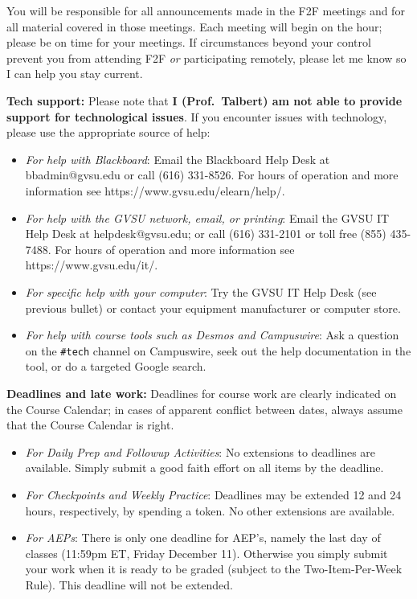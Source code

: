 \documentclass[]{article}
\providecommand{\tightlist}{%
  \setlength{\itemsep}{0pt}\setlength{\parskip}{0pt}}
\begin{document}
You will be responsible for all announcements made in the F2F meetings
and for all material covered in those meetings. Each meeting will begin
on the hour; please be on time for your meetings. If circumstances
beyond your control prevent you from attending F2F \emph{or}
participating remotely, please let me know so I can help you stay
current.

\textbf{Tech support:} Please note that \textbf{I (Prof.~Talbert) am not
able to provide support for technological issues}. If you encounter
issues with technology, please use the appropriate source of help:

\begin{itemize}
\tightlist
\item
  \emph{For help with Blackboard}: Email the Blackboard Help Desk at
  bbadmin@gvsu.edu or call (616) 331-8526. For hours of operation and
  more information see https://www.gvsu.edu/elearn/help/.
\item
  \emph{For help with the GVSU network, email, or printing}: Email the
  GVSU IT Help Desk at helpdesk@gvsu.edu; or call (616) 331-2101 or toll
  free (855) 435-7488. For hours of operation and more information see
  https://www.gvsu.edu/it/.
\item
  \emph{For specific help with your computer}: Try the GVSU IT Help Desk
  (see previous bullet) or contact your equipment manufacturer or
  computer store.
\item
  \emph{For help with course tools such as Desmos and Campuswire}: Ask a
  question on the \texttt{\#tech} channel on Campuswire, seek out the
  help documentation in the tool, or do a targeted Google search.
\end{itemize}

\textbf{Deadlines and late work:} Deadlines for course work are clearly
indicated on the Course Calendar; in cases of apparent conflict between
dates, always assume that the Course Calendar is right.

\begin{itemize}
\tightlist
\item
  \emph{For Daily Prep and Followup Activities}: No extensions to
  deadlines are available. Simply submit a good faith effort on all
  items by the deadline.
\item
  \emph{For Checkpoints and Weekly Practice}: Deadlines may be extended
  12 and 24 hours, respectively, by spending a token. No other
  extensions are available.
\item
  \emph{For AEPs}: There is only one deadline for AEP's, namely the last
  day of classes (11:59pm ET, Friday December 11). Otherwise you simply
  submit your work when it is ready to be graded (subject to the
  Two-Item-Per-Week Rule). This deadline will not be extended.
\end{itemize}
\end{document}
